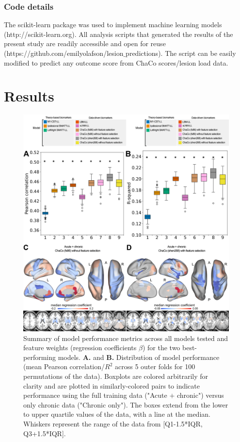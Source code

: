 \documentclass[10pt]{article}
\def\Plus{\texttt{+}}
\begin{document}
\subsubsection*{Code details}
The scikit-learn package was used to implement machine learning models (http://scikit-learn.org). All analysis scripts that generated the results of the present study are readily accessible and open for reuse (https://github.com/emilyolafson/lesion$\_$predictions). The script can be easily modified to predict any outcome score from ChaCo scores/lesion load data.

\section{Results}


\begin{figure}[htp]
\centering
\includegraphics[width=1\linewidth]{figures/Analysis1.png}
\caption{Summary of model performance metrics across all models tested and feature weights (regression coefficients $\beta$) for the two best-performing models.  \textbf{A.} and \textbf{B.} Distribution of model performance (mean Pearson correlation/$R^2$ across 5 outer folds for 100 permutations of the data).  Boxplots are colored arbitrarily for clarity and are plotted in similarly-colored pairs to indicate performance using the full training data ("Acute $\Plus$  chronic") versus only chronic data ("Chronic only"). The boxes extend from the lower to upper quartile values of the data, with a line at the median. Whiskers represent the range of the data from [Q1-1.5*IQR, Q3+1.5*IQR].
}
\end{figure}
\end{document}
